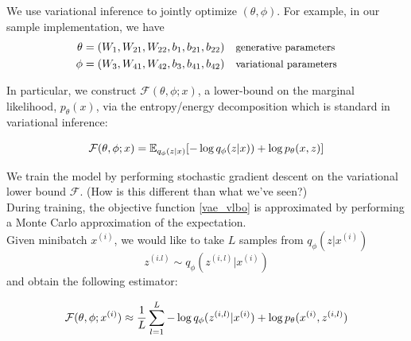 \documentclass[10pt]{beamer}
\begin{document}
\begin{frame}{}
We use variational inference to \alert{jointly} optimize $(\theta, \phi)$.  For example, in our sample implementation, we have 
\begin{align*}
\theta &= (W_1, W_{21}, W_{22}, b_1, b_{21}, b_{22})  && \small \text{generative parameters} \\ 
\phi &= (W_3, W_{41}, W_{42}, b_3, b_{41}, b_{42}) && \small \text{variational parameters}
\end{align*}

In particular, we construct $\mathcal{F}(\theta, \phi; x)$, a lower-bound on the marginal likelihood, $p_\theta(x)$, via the entropy/energy decomposition which is standard in variational inference:   

\begin{equation}
\label{vae_vlbo}
\mathcal{F}(\theta, \phi; x) = \mathbb{E}_{q_\phi(z| x)} [- \log q_\phi(z| x)) + \log p_\theta(x, z ) ]
\end{equation} 
\end{frame}

\begin{frame}{}


  
We train the model by performing stochastic gradient descent on the variational lower bound $\mathcal{F}$.  \tiny (How is this different than what we've seen?) \normalsize \pause \\
\vfill
During training, the objective function \eqref{vae_vlbo} is approximated by performing a Monte Carlo approximation of the expectation.   \\
\vfill
Given minibatch $x^{(i)}$, we would like to take $L$ samples from $q_\phi(z| x^{(i)})$ 
\[  z^{(i.l)} \sim q_\phi(z^{(i,l)} | x^{(i)})\]
and obtain the following estimator:

\begin{equation}
\label{vae_sgvb}
 \mathcal{F}(\theta, \phi; x^{(i)}) \approx \displaystyle\frac{1}{L} \displaystyle\sum_{l=1}^L - \log q_\phi(z^{(i,l)} | x^{(i)}) + \log p_\theta( x^{(i)}, z^{(i,l)} ) 
\end{equation} 
\end{frame}
\end{document}
